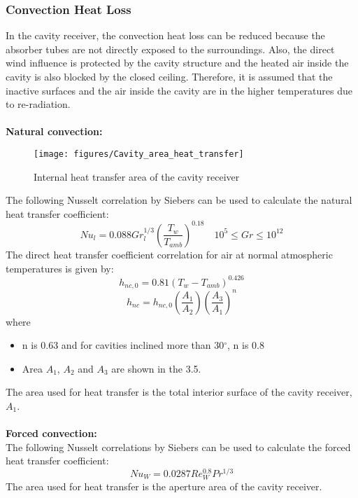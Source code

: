 \subsubsection{Convection Heat Loss}
In the cavity receiver, the convection heat loss can be reduced because the absorber tubes are not directly exposed to the surroundings. Also, the direct wind influence is protected by the cavity structure and the heated air inside the cavity is also blocked by the closed ceiling. Therefore, it is assumed that the inactive surfaces and the air inside the cavity are in the higher temperatures due to re-radiation.\\\\
\textbf{{Natural convection:}}\\[0.2cm]
\begin{figure}[ht]
	\texttt{[image: figures/Cavity\_area\_heat\_transfer]}
	\centering
	\caption{Internal heat transfer area of the cavity receiver \cite{Siebers.1984}}	
\end{figure}
The following Nusselt correlation by Siebers can be used to calculate the natural heat transfer coefficient:
\begin{equation}
Nu_l = 0.088Gr_l^{1/3} \left(\frac{T_w}{T_{amb}}\right)^{0.18} \quad  10^5 \le Gr \le 10^{12}
\end{equation}
The direct heat transfer coefficient correlation for air at normal atmospheric temperatures is given by:
\begin{equation}
h_{nc,0} = 0.81(T_w - T_{amb})^{0.426}
\end{equation}
\begin{equation}
h_{nc} = h_{nc,0} \left(\frac{A_1}{A_2}\right) \left(\frac{A_3}{A_1}\right)^n
\end{equation}
where
\begin{itemize}
	\item n is 0.63 and for cavities inclined more than 30$^\circ$, n is 0.8
	\item Area $A_1$, $A_2$ and $A_3$ are shown in the \figurename{ 3.5}.
\end{itemize}
 The area used for heat transfer is the total interior surface of the cavity receiver, $A_1$.\\\\
\textbf{{Forced convection:}}\\[0.2cm]
The following Nusselt correlations by Siebers can be used to calculate the forced heat transfer coefficient:
\begin{equation}
Nu_W = 0.0287Re_W^{0.8}Pr^{1/3}
\end{equation}
The area used for heat transfer is the aperture area of the cavity receiver.
